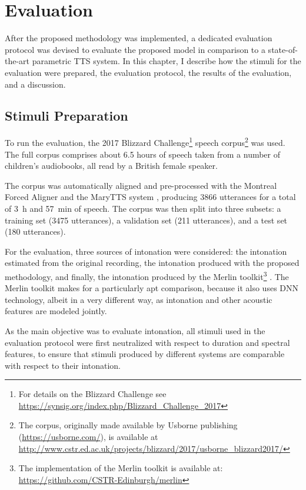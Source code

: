 
\chapter{Evaluation}\label{chap:evaluation}

After the proposed methodology was implemented, a dedicated evaluation protocol was devised to evaluate the proposed model in comparison to a state-of-the-art parametric  \ac{TTS} system.
In this chapter, I describe how the stimuli for the evaluation were prepared, the evaluation protocol, the results of the evaluation, and a discussion.

\section{Stimuli Preparation}

To run the evaluation, the 2017 Blizzard Challenge\footnote{For details on the Blizzard Challenge see \url{https://synsig.org/index.php/Blizzard_Challenge_2017}} speech corpus\footnote{The corpus, originally made available by Usborne publishing (\url{https://usborne.com/}), is available at \url{http://www.cstr.ed.ac.uk/projects/blizzard/2017/usborne_blizzard2017/}} was used.
The full corpus comprises about 6.5 hours of speech taken from a number of children's audiobooks, all read by a British female speaker.

The corpus was automatically aligned and pre-processed with the Montreal Forced Aligner \citep{McAuliffe2017Montreal} and the MaryTTS system \citep{LeMaguer2017Uprooting}, producing 3866 utterances for a total of 3~h and 57~min of speech.
The corpus was then split into three subsets: a training set (3475 utterances), a validation set (211 utterances), and a test set (180 utterances).

For the evaluation, three sources of intonation were considered: the intonation estimated from the original recording, the intonation produced with the proposed methodology, and finally, the intonation produced by the Merlin toolkit\footnote{The implementation of the Merlin toolkit is available at: \url{https://github.com/CSTR-Edinburgh/merlin}} \citep{Wu2016Merlin}.
The Merlin toolkit makes for a particularly apt comparison, because it also uses \ac{DNN} technology, albeit in a very different way, as intonation and other acoustic features are modeled jointly.

As the main objective was to evaluate intonation, all stimuli used in the evaluation protocol were first neutralized with respect to duration and spectral features, to ensure that stimuli produced by different systems are comparable with respect to their intonation.

